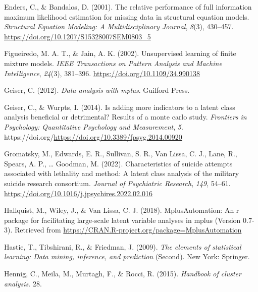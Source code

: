 \documentclass[
  ,man,floatsintext]{apa6}
\newlength{\cslhangindent}
\newlength{\cslentryspacingunit} %
\newenvironment{CSLReferences}[2] %
 {%
  \setlength{\parindent}{0pt}
  \ifodd #1
  \let\oldpar\par
  \def\par{\hangindent=\cslhangindent\oldpar}
  \fi
  \setlength{\parskip}{#2\cslentryspacingunit}
 }%
 {}
\begin{document}
\begin{CSLReferences}{1}{0}
\leavevmode{}%
Enders, C., \& Bandalos, D. (2001). The relative performance of full information maximum likelihood estimation for missing data in structural equation models. \emph{Structural Equation Modeling: A Multidisciplinary Journal}, \emph{8}(3), 430--457. \url{https://doi.org/10.1207/S15328007SEM0803_5}

\leavevmode{}%
Figueiredo, M. A. T., \& Jain, A. K. (2002). Unsupervised learning of finite mixture models. \emph{{IEEE} Transactions on Pattern Analysis and Machine Intelligence}, \emph{24}(3), 381--396. \url{https://doi.org/10.1109/34.990138}

\leavevmode{}%
Geiser, C. (2012). \emph{Data analysis with mplus}. Guilford Press.

\leavevmode{}%
Geiser, C., \& Wurpts, I. (2014). Is adding more indicators to a latent class analysis beneficial or detrimental? Results of a monte carlo study. \emph{Frontiers in Psychology: Quantitative Psychology and Measurement}, \emph{5}. https://doi.org/\url{https://doi.org/10.3389/fpsyg.2014.00920}

\leavevmode{}%
Gromatsky, M., Edwards, E. R., Sullivan, S. R., Van Lissa, C. J., Lane, R., Spears, A. P., \ldots{} Goodman, M. (2022). Characteristics of suicide attempts associated with lethality and method: A latent class analysis of the military suicide research consortium. \emph{Journal of Psychiatric Research}, \emph{149}, 54--61. \url{https://doi.org/10.1016/j.jpsychires.2022.02.016}

\leavevmode{}%
Hallquist, M., Wiley, J., \& Van Lissa, C. J. (2018). {MplusAutomation}: An r package for facilitating large-scale latent variable analyses in mplus (Version 0.7-3). Retrieved from \url{https://CRAN.R-project.org/package=MplusAutomation}

\leavevmode{}%
Hastie, T., Tibshirani, R., \& Friedman, J. (2009). \emph{The elements of statistical learning: Data mining, inference, and prediction} (Second). New York: Springer.

\leavevmode{}%
Hennig, C., Meila, M., Murtagh, F., \& Rocci, R. (2015). \emph{Handbook of cluster analysis}. 28.


\end{CSLReferences}
\end{document}
